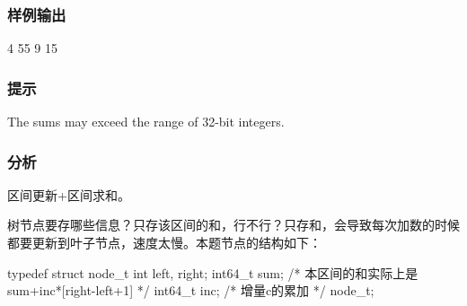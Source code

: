 \subsubsection{样例输出}
\begin{Code}
4
55
9
15
\end{Code}

\subsubsection{提示}
The sums may exceed the range of 32-bit integers.

\subsubsection{分析}
区间更新+区间求和。

树节点要存哪些信息？只存该区间的和，行不行？只存和，会导致每次加数的时候都要更新到叶子节点，速度太慢。本题节点的结构如下：
\begin{Code}
typedef struct node_t {
    int left, right;
    int64_t sum;  /* 本区间的和实际上是sum+inc*[right-left+1] */
    int64_t inc;  /* 增量c的累加 */
} node_t;
\end{Code}

